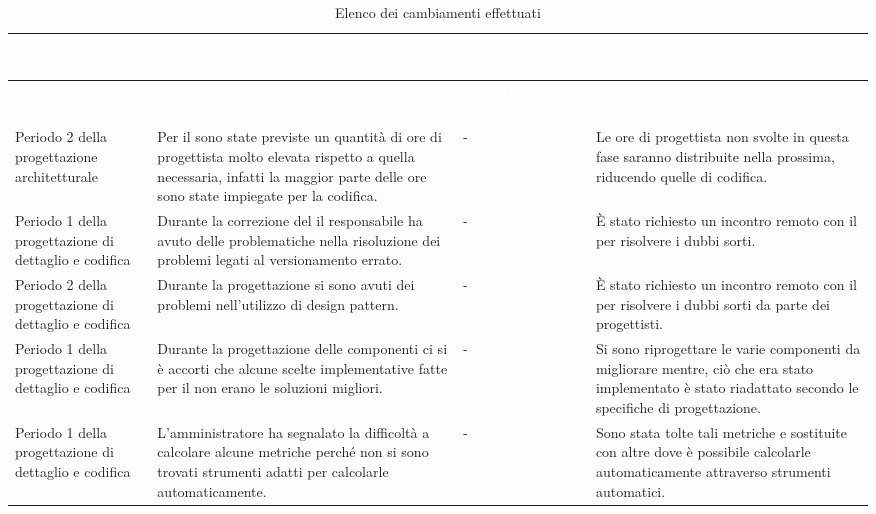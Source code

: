 {
	\renewcommand{\arraystretch}{1.5}
	\centering
	\begin{longtable}{ C{3cm} C{4cm} C{3cm} C{4cm}}
		\caption{Elenco dei cambiamenti effettuati}\\
		\textcolor{white}{\textbf{Periodo}} & \textcolor{white}{\textbf{Problema}} & \textcolor{white}{\textbf{Obiettivo di miglioramento}} & \textcolor{white}{\textbf{Soluzione}}\\
		\endfirsthead
		\textcolor{white}{\textbf{Periodo}} & \textcolor{white}{\textbf{Problema}} &
		\textcolor{white}{\textbf{Obiettivo di miglioramento}} & \textcolor{white}{\textbf{Soluzione}}\\
		\endhead
		
		Periodo 2 della progettazione architetturale & Per il  sono state previste un quantità di ore di progettista molto elevata rispetto a quella necessaria, infatti la maggior parte delle ore sono state impiegate per la codifica. & - & Le ore di progettista non svolte in questa fase saranno distribuite nella prossima, riducendo quelle di codifica.\\
		
		Periodo 1 della progettazione di dettaglio e codifica & Durante la correzione del \PdP il responsabile ha avuto delle problematiche nella risoluzione dei problemi legati al versionamento errato. & - & È stato richiesto un incontro remoto con il \VT{} per risolvere i dubbi sorti.\\
		
		Periodo 2 della progettazione di dettaglio e codifica & Durante la progettazione si sono avuti dei problemi nell'utilizzo di design pattern. & - & È stato richiesto un incontro remoto con il \CR{} per risolvere i dubbi sorti da parte dei progettisti.\\
		
		Periodo 1 della progettazione di dettaglio e codifica & Durante la progettazione delle componenti ci si è accorti che alcune scelte implementative fatte per il  non erano le soluzioni migliori. & - & Si sono riprogettare le varie componenti da migliorare mentre, ciò che era stato implementato è stato riadattato secondo le specifiche di progettazione. \\
		
		Periodo 1 della progettazione di dettaglio e codifica & L'amministratore ha segnalato la difficoltà a calcolare alcune metriche perché non si sono trovati strumenti adatti per calcolarle automaticamente. & - & Sono stata tolte tali metriche e sostituite con altre dove è possibile calcolarle automaticamente attraverso strumenti automatici. \\
		
		
	\end{longtable}
}
\newpage
